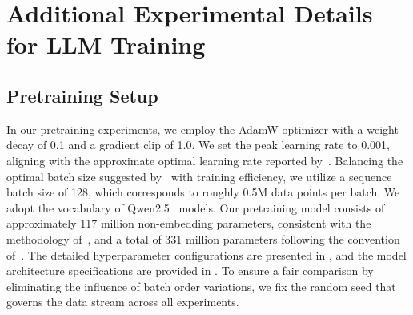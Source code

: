 \section{Additional Experimental Details for LLM Training}

\subsection{Pretraining Setup}\label{app:setup}

In our pretraining experiments, we employ the AdamW optimizer with a weight decay of 0.1 and a gradient clip of 1.0. We set the peak learning rate to 0.001, aligning with the approximate optimal learning rate reported by~\citet{li2025predictablescalei}. Balancing the optimal batch size suggested by~\citet{li2025predictablescalei} with training efficiency, we utilize a sequence batch size of 128, which corresponds to roughly 0.5M data points per batch. We adopt the vocabulary of Qwen2.5~\citep{qwen2025qwen25technicalreport} models. Our pretraining model consists of approximately 117 million non-embedding parameters, consistent with the methodology of~\citet{kaplan2020scaling}, and a total of 331 million parameters following the convention of~\citet{hoffmann2022training}. The detailed hyperparameter configurations are presented in , and the model architecture specifications are provided in . To ensure a fair comparison by eliminating the influence of batch order variations, we fix the random seed that governs the data stream across all experiments.

    

